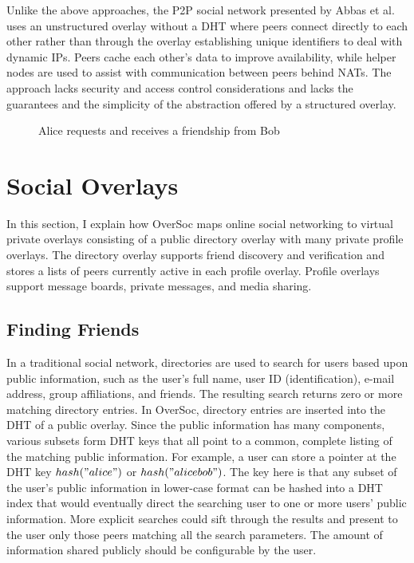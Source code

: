 Unlike the above approaches, the P2P social network presented by Abbas et
al.~\cite{tribler-osn} uses an unstructured overlay without a DHT where peers
connect directly to each other rather than through the overlay establishing
unique identifiers to deal with dynamic IPs.  Peers cache each other's data to
improve availability, while helper nodes are used to assist with communication
between peers behind NATs.  The approach lacks security and access control
considerations and lacks the guarantees and the simplicity of the abstraction
offered by a structured overlay.

\begin{figure}
\centering
{}
\caption{Alice requests and receives a friendship from Bob}
\label{fig:friend_request}
\end{figure}

\section{Social Overlays}
\label{vpo:social_overlays}

In this section, I explain how OverSoc maps online social networking to virtual
private overlays consisting of a public directory overlay with many private
profile overlays.  The directory overlay supports friend discovery and
verification and stores a lists of peers currently active in each profile
overlay.  Profile overlays support message boards, private messages, and media
sharing.

\subsection{Finding Friends}

In a traditional social network, directories are used to search for users based
upon public information, such as the user's full name, user ID
(identification), e-mail address, group affiliations, and friends.  The
resulting search returns zero or more matching directory entries.  In OverSoc,
directory entries are inserted into the DHT of a public overlay.  Since the
public information has many components, various subsets form DHT keys that all
point to a common, complete listing of the matching public information.  For
example, a user can store a pointer at the DHT key $hash("alice")$ or
$hash("alice bob")$.  The key here is that any subset of the user's public
information in lower-case format can be hashed into a DHT index that would
eventually direct the searching user to one or more users' public information.
More explicit searches could sift through the results and present to the user
only those peers matching all the search parameters.  The amount of information
shared publicly should be configurable by the user.

